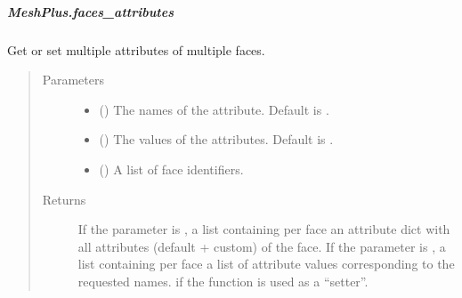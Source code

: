 \documentclass[letterpaper,10pt,english]{sphinxmanual}
\begin{document}
\begin{fulllineitems}
\begin{fulllineitems}
\begin{quote}
\begin{description}
\end{description}\end{quote}

\end{fulllineitems}



\subparagraph{MeshPlus.faces\_attributes}
\label{\detokenize{api/generated/directional_clustering.mesh.MeshPlus.faces_attributes:meshplus-faces-attributes}}\label{\detokenize{api/generated/directional_clustering.mesh.MeshPlus.faces_attributes::doc}}

\begin{fulllineitems}
\label{\detokenize{api/generated/directional_clustering.mesh.MeshPlus.faces_attributes:directional_clustering.mesh.MeshPlus.faces_attributes}}
Get or set multiple attributes of multiple faces.
\begin{quote}\begin{description}
\item[{Parameters}] \leavevmode\begin{itemize}
\item {} 
 () \textendash{} The names of the attribute.
Default is .

\item {} 
 () \textendash{} The values of the attributes.
Default is .

\item {} 
 () \textendash{} A list of face identifiers.

\end{itemize}

\item[{Returns}] \leavevmode
{} \textendash{} If the parameter  is ,
a list containing per face an attribute dict with all attributes (default + custom) of the face.
If the parameter  is ,
a list containing per face a list of attribute values corresponding to the requested names.
 if the function is used as a “setter”.


\end{description}
\end{quote}
\end{fulllineitems}
\end{fulllineitems}
\end{document}
